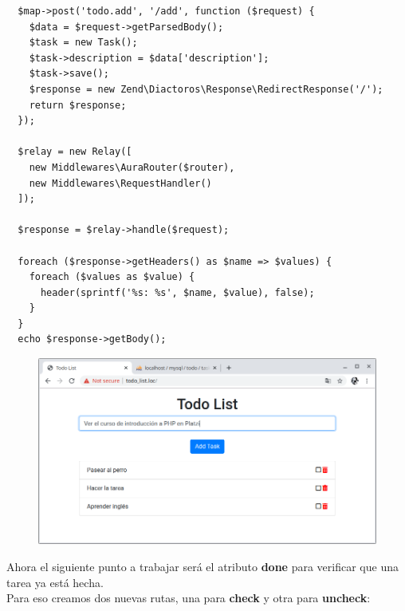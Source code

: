 \documentclass{article}
\begin{document}
\begin{verbatim}
  $map->post('todo.add', '/add', function ($request) {
    $data = $request->getParsedBody();
    $task = new Task();
    $task->description = $data['description'];
    $task->save();
    $response = new Zend\Diactoros\Response\RedirectResponse('/');
    return $response;
  });

  $relay = new Relay([
    new Middlewares\AuraRouter($router),
    new Middlewares\RequestHandler()
  ]);

  $response = $relay->handle($request);

  foreach ($response->getHeaders() as $name => $values) {
    foreach ($values as $value) {
      header(sprintf('%s: %s', $name, $value), false);
    }
  }
  echo $response->getBody();
\end{verbatim}

\newpage

\begin{figure}[h!]
  \centering
  \includegraphics[scale=0.5]{./Pictures/105_addFuncional.png}
\end{figure}

Ahora el siguiente punto a trabajar será el atributo \textbf{done} para
verificar que una tarea ya está hecha.\\

Para eso creamos dos nuevas rutas, una para \textbf{check} y otra para
\textbf{uncheck}:\\
\end{document}
